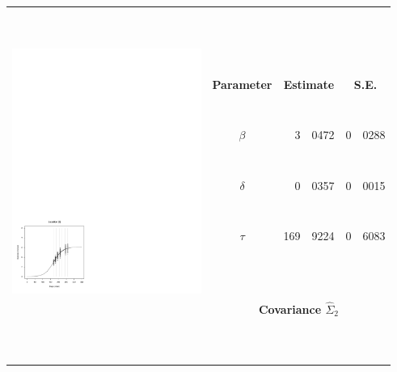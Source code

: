 


		\begin{tabular}{ccr@{.}lr@{.}l}
		\hline
		\hline
		 & &  \multicolumn{2}{c}{\ } & \multicolumn{2}{c}{\ } \\
		  & &  \multicolumn{2}{c}{\ } & \multicolumn{2}{c}{\ } \\
		 \multirow{10}{*}{ \includegraphics[height=80mm]{graphics/location_2.pdf}} &  \multicolumn{2}{c}{\ } & \multicolumn{2}{c}{\ } \\
		 & {\bf{Parameter}} & \multicolumn{2}{c}{{\bf{Estimate}}} & \multicolumn{2}{c}{{\bf{S.E.}}}  \\
		\cline{2-6}
		 & &  \multicolumn{2}{c}{\ } & \multicolumn{2}{c}{\ } \\
		& {\bf{$\beta$}} &	  3&0472		& 0&0288		\\
		 & &  \multicolumn{2}{c}{\ } & \multicolumn{2}{c}{\ } \\
		& {\bf{$\delta$}} &	  0&0357		& 0&0015		 \\
		 & &  \multicolumn{2}{c}{\ } & \multicolumn{2}{c}{\ } \\
		& {\bf{$\tau$}}	&	169&9224		& 0&6083		 \\
		 & &  \multicolumn{2}{c}{\ } & \multicolumn{2}{c}{\ } \\
		 & &  \multicolumn{2}{c}{\ } & \multicolumn{2}{c}{\ } \\
		 & \multicolumn{5}{c}{\bf{Covariance} $\hat{\Sigma}_2$ } \\
		\cline{2-6}
		& \multicolumn{5}{c}{ } \\
		 & &  \multicolumn{2}{c}{\ } & \multicolumn{2}{c}{\ } \\
		  & &  \multicolumn{2}{c}{\ } & \multicolumn{2}{c}{\ } \\
		 \hline
		\hline
		\end{tabular}
